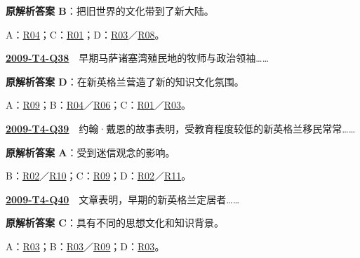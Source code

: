 \documentclass[11pt,a4paper]{article}
\begin{document}
\noindent\textbf{原解析答案 B}：把旧世界的文化带到了新大陆。\par\nopagebreak
\noindent A：\hyperref[cat-R04]{R04}；C：\hyperref[cat-R01]{R01}；D：\hyperref[cat-R03]{R03}／\hyperref[cat-R08]{R08}。\par\smallskip
{}\label{idx-2009-T4-Q38}\noindent\textbf{\href{https://zj139.github.io/math-notes/english/2431fdcbaabb4f629f70bb44/\#q38}{2009-T4-Q38}}　早期马萨诸塞湾殖民地的牧师与政治领袖……\par\nopagebreak
\noindent\textbf{原解析答案 D}：在新英格兰营造了新的知识文化氛围。\par\nopagebreak
\noindent A：\hyperref[cat-R09]{R09}；B：\hyperref[cat-R04]{R04}／\hyperref[cat-R06]{R06}；C：\hyperref[cat-R01]{R01}／\hyperref[cat-R03]{R03}。\par\smallskip
{}\label{idx-2009-T4-Q39}\noindent\textbf{\href{https://zj139.github.io/math-notes/english/2431fdcbaabb4f629f70bb44/\#q39}{2009-T4-Q39}}　约翰·戴恩的故事表明，受教育程度较低的新英格兰移民常常……\par\nopagebreak
\noindent\textbf{原解析答案 A}：受到迷信观念的影响。\par\nopagebreak
\noindent B：\hyperref[cat-R02]{R02}／\hyperref[cat-R10]{R10}；C：\hyperref[cat-R09]{R09}；D：\hyperref[cat-R02]{R02}／\hyperref[cat-R11]{R11}。\par\smallskip
{}\label{idx-2009-T4-Q40}\noindent\textbf{\href{https://zj139.github.io/math-notes/english/2431fdcbaabb4f629f70bb44/\#q40}{2009-T4-Q40}}　文章表明，早期的新英格兰定居者……\par\nopagebreak
\noindent\textbf{原解析答案 C}：具有不同的思想文化和知识背景。\par\nopagebreak
\noindent A：\hyperref[cat-R03]{R03}；B：\hyperref[cat-R03]{R03}／\hyperref[cat-R09]{R09}；D：\hyperref[cat-R03]{R03}。\par\smallskip
\clearpage
\end{document}
